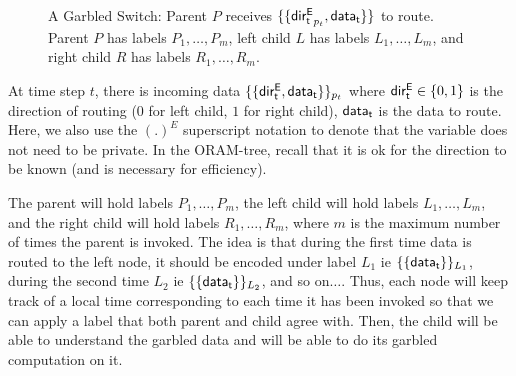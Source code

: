 \begin{figure}
    \centering
    \caption{A Garbled Switch: Parent $P$ receives $\{\{ \mathsf{dir_t^E}_{p_t}, \mathsf{data_t}\}\}$ to route. Parent $P$ has labels $P_1,\dots,P_m$, left child $L$ has labels $L_1,\dots,L_m$, and right child $R$ has labels $R_1,\dots,R_m$.}
    \label{fig:switch}
\end{figure}

At time step $t$, there is incoming data $\{\{ \mathsf{dir_t^E}, \mathsf{data_t}\}\}_{p_t}$ where $\mathsf{dir_t^E} \in \{0,1\}$ is the direction of routing ($0$ for left child, $1$ for right child), $\mathsf{data_t}$ is the data to route. 
Here, we also use the $(.)^E$ superscript notation to denote that the variable does not need to be private. In the ORAM-tree, recall that it is ok for the direction to be known (and is necessary for efficiency). 

The parent will hold labels $P_1,\dots,P_m$, the left child will hold labels $L_1,\dots,L_m$, and the right child will hold labels $R_1,\dots,R_m$, where $m$ is the maximum number of times the parent is invoked. 
The idea is that during the first time data is routed to the left node, it should be encoded under label $L_1$ ie $\{\{ \mathsf{data_t}\}\}_{L_1}$, during the second time $L_2$ ie $\{\{ \mathsf{data_t}\}\}_{L_2}$, and so on$\dots$.
Thus, each node will keep track of a local time corresponding to each time it has been invoked so that we can apply a label that both parent and child agree with.
Then, the child will be able to understand the garbled data and will be able to do its garbled computation on it.

